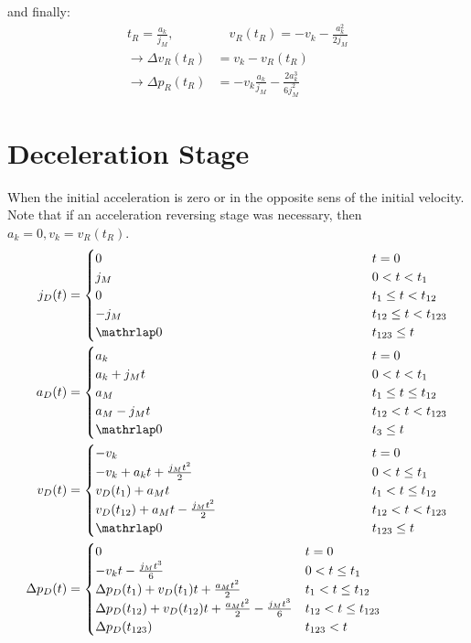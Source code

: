 and finally:
\begin{align}
t_R  = \frac{a_k}{j_M},&
\quad v_R(t_R) = -v_k -\frac{a_k^2}{2j_M} \\
\rightarrow \Delta v_R (t_R) &= v_k- v_R(t_R) \\
\rightarrow \Delta p_R (t_R) &= -v_k \frac{a_k}{j_M}
- \frac{2a_k^3}{6j_M^2}
\end{align}


\section{Deceleration Stage}

When the initial  acceleration is zero or in the opposite sens of the initial
velocity. Note that if an acceleration reversing stage was necessary,
then~${a_k=0, v_k=v_R(t_R)}$.
{
\smaller
\newcommand\longest[0]{\Delta p_D(t_{12}) + v_D(t_{12})t + \frac{a_M t^2}{2} - \frac{j_M t^3}{6}}
\begin{align}
j_D (t) &=
\begin{cases}
      0 & t=0 \\
      j_M & 0 < t < t_1 \\
      0 & t_1 \leq t < t_{12} \\
      -j_M & t_{12} \leq t  < t_{123} \\
      \mathrlap0\hphantom{\longest}& t_{123} \leq t
\end{cases}\\
a_D (t) &=
\begin{cases}
      a_k & t=0 \\
      a_k + j_M t & 0 < t < t_1 \\
      a_M & t_1 \leq t \leq t_{12} \\
      a_M -j_M t & t_{12} < t < t_{123} \\
      \mathrlap0\hphantom{\longest}& t_3 \leq t
\end{cases}\\
v_D (t) &=
\begin{cases}
      -v_k & t=0 \\
      -v_k + a_k t + \frac{j_M t^2}{2} & 0 < t\leq t_1 \\
      v_D(t_1)+a_Mt & t_1 < t \leq t_{12} \\
    v_D(t_{12}) + a_M t - \frac{j_M t^2}{2}  & t_{12} < t < t_{123} \\
\mathrlap0\hphantom{\longest}& t_{123} \leq t
\end{cases}\\
\Delta p_D (t) &=
\begin{cases}
     0 & t=0 \\
    -v_k t - \frac{j_Mt^3}{6} & 0 < t\leq t_1 \\
    \Delta p_D(t_1) + v_D(t_1)t + \frac{a_Mt^2}{2} & t_1 < t \leq t_{12} \\
    \longest
    & t_{12} < t \leq t_{123} \\
      \Delta p_D(t_{123}) & t_{123} < t
\end{cases}
\end{align}
}

